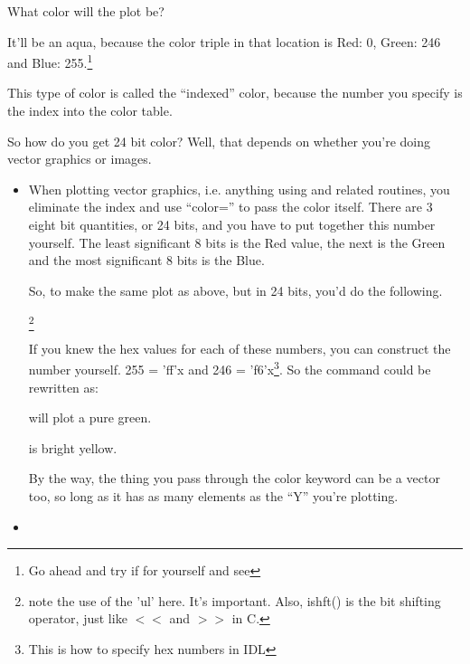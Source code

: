 \begin{itemize}

  What color will the plot be?

  It'll be an aqua, because the color triple in that location is 
  Red: 0,  Green: 246 and   Blue: 255.\footnote{Go ahead and try if
  for yourself and see}

  This type of color is called the ``indexed'' color, because the
  number you specify is the index into the color table. 

  So how do you get 24 bit color? Well, that depends on whether you're
  doing vector graphics or images.

  \begin{itemize}

  \item {} 

  When plotting vector graphics, i.e. anything using  and
  related routines, you eliminate the index and use ``color='' to pass
  the color itself. There are 3 eight bit quantities, or 24 bits, and
  you have to put together this number yourself. The least significant
  8 bits is the Red value, the next is the Green and the most
  significant 8 bits is the Blue.

  So, to make the same plot as above, but in 24 bits, you'd do the
  following.

  \footnote{note the use of the 'ul'
  here. It's important. Also, ishft() is the bit shifting operator,
  just like $<$$<$  and $>$$>$ in C.}


  If you knew the hex values for each of these numbers, you can
  construct the number yourself. 255 = 'ff'x and 246 =
  'f6'x\footnote{This is how to specify hex numbers in IDL}. So the
  command could be rewritten as:


    will plot a pure green.

    is bright yellow.

     By the way, the thing you pass through the color keyword can be a
  vector too, so long as it has as many elements as the ``Y'' you're
  plotting.


  \item {}


\end{itemize}
\end{itemize}
